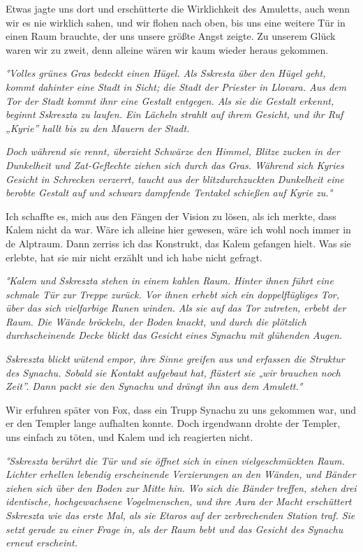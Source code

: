 \documentclass[11pt]{scrartcl}
\begin{document}
Etwas jagte uns dort und erschütterte die Wirklichkeit des Amuletts,
auch wenn wir es nie wirklich sahen, und wir flohen nach oben, bis uns
eine weitere Tür in einen Raum brauchte, der uns unsere größte Angst
zeigte. Zu unserem Glück waren wir zu zweit, denn alleine wären wir kaum
wieder heraus gekommen.

\emph{°Volles grünes Gras bedeckt einen Hügel. Als Sskresta über den
Hügel geht, kommt dahinter eine Stadt in Sicht; die Stadt der Priester
in Llovara. Aus dem Tor der Stadt kommt ihnr eine Gestalt entgegen. Als
sie die Gestalt erkennt, beginnt Sskreszta zu laufen. Ein Lächeln
strahlt auf ihrem Gesicht, und ihr Ruf „Kyrie'' hallt bis zu den Mauern
der Stadt.}

\emph{Doch während sie rennt, überzieht Schwärze den Himmel, Blitze
zucken in der Dunkelheit und Zat-Geflechte ziehen sich durch das Gras.
Während sich Kyries Gesicht in Schrecken verzerrt, taucht aus der
blitzdurchzuckten Dunkelheit eine berobte Gestalt auf und schwarz
dampfende Tentakel schießen auf Kyrie zu.°}

Ich schaffte es, mich aus den Fängen der Vision zu lösen, als ich
merkte, dass Kalem nicht da war. Wäre ich alleine hier gewesen, wäre ich
wohl noch immer in de Alptraum. Dann zerriss ich das Konstrukt, das
Kalem gefangen hielt. Was sie erlebte, hat sie mir nicht erzählt und ich
habe nicht gefragt.

\emph{°Kalem und Sskreszta stehen in einem kahlen Raum. Hinter ihnen
führt eine schmale Tür zur Treppe zurück. Vor ihnen erhebt sich ein
doppelflügliges Tor, über das sich vielfarbige Runen winden. Als sie auf
das Tor zutreten, erbebt der Raum. Die Wände bröckeln, der Boden knackt,
und durch die plötzlich durchscheinende Decke blickt das Gesicht eines
Synachu mit glühenden Augen.}

\emph{Sskreszta blickt wütend empor, ihre Sinne greifen aus und erfassen
die Struktur des Synachu. Sobald sie Kontakt aufgebaut hat, flüstert sie
„wir brauchen noch Zeit''. Dann packt sie den Synachu und drängt ihn aus
dem Amulett.°}

Wir erfuhren später von Fox, dass ein Trupp Synachu zu uns gekommen war,
und er den Templer lange aufhalten konnte. Doch irgendwann drohte der
Templer, uns einfach zu töten, und Kalem und ich reagierten nicht.

\emph{°Sskreszta berührt die Tür und sie öffnet sich in einen
vielgeschmückten Raum. Lichter erhellen lebendig erscheinende
Verzierungen an den Wänden, und Bänder ziehen sich über den Boden zur
Mitte hin. Wo sich die Bänder treffen, stehen drei identische,
hochgewachsene Vogelmenschen, und ihre Aura der Macht erschüttert
Sskreszta wie das erste Mal, als sie Etaros auf der zerbrechenden
Station traf. Sie setzt gerade zu einer Frage in, als der Raum bebt und
das Gesicht des Synachu erneut erscheint.}
\end{document}
